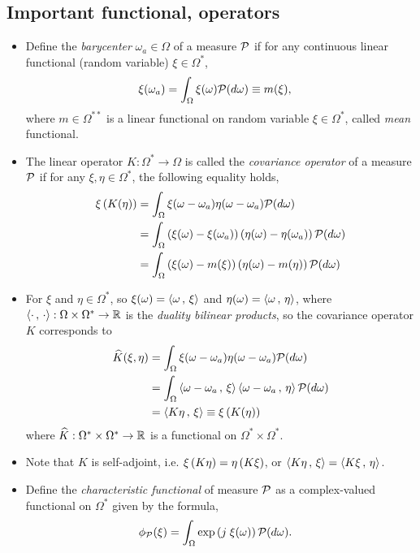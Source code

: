 \documentclass[11pt]{article}
\begin{document}
\subsection{Important functional, operators}
\begin{itemize}
\item Define the \emph{barycenter} $\omega_{a}\in \Omega$ of a measure ${\mathcal P}$ if for any continuous linear functional (random variable) $\xi\in \Omega^{*}$, 
\begin{align}
\xi(\omega_{a}) &= \int_{\Omega}\xi(\omega){\mathcal P}(d\omega) \equiv m(\xi)  , \label{expr: mean_operator}
\end{align}
where $m\in \Omega^{**}$ is a linear functional on random variable $\xi \in \Omega^{*}$, called \emph{mean} functional.

\item The linear operator  $K: \Omega^{*} \rightarrow \Omega$ is called the \emph{covariance operator} of a measure ${\mathcal P}$ if  for any $\xi, \eta \in \Omega^{*}$,  the following equality holds,
\begin{align}
\xi\left( K(\eta ) \right) &= \int_{\Omega}\xi(\omega - \omega_{a})\eta(\omega - \omega_{a}){\mathcal P}(d\omega) \nonumber\\
&= \int_{\Omega}\left(\xi(\omega) - \xi(\omega_{a})\right)\left(\eta(\omega) - \eta(\omega_{a})\right){\mathcal P}(d\omega)\nonumber\\
&= \int_{\Omega}\left(\xi(\omega) - m(\xi)\right)\left(\eta(\omega) - m(\eta)\right){\mathcal P}(d\omega) \label{expr: covariance_operator}
\end{align}

\item For $\xi$ and $\eta\in \Omega^{*}$, so $\xi(\omega) = \left\langle \omega\,,\, \xi \right\rangle$ and $\eta(\omega) = \left\langle \omega\,,\, \eta \right\rangle$, where $\left\langle \cdot\,,\, \cdot \right\rangle: \Omega\times \Omega^{*}  \rightarrow {\mathbb R}$ is the \emph{duality bilinear products}, so the covariance operator $K$ corresponds to 
\begin{align}
 \widehat{K}(\xi, \eta) &= \int_{\Omega}\xi(\omega - \omega_{a})\eta(\omega - \omega_{a}){\mathcal P}(d\omega) \nonumber\\
&= \int_{\Omega}\left\langle \omega - \omega_{a}\,,\, \xi \right\rangle \left\langle \omega - \omega_{a}\,,\, \eta \right\rangle{\mathcal P}(d\omega) \nonumber\\
&= \left\langle K\eta\,,\, \xi \right\rangle\equiv  \xi\left( K(\eta ) \right)
\end{align}
where $\widehat{K}: \Omega^{*} \times \Omega^{*} \rightarrow {\mathbb R}$ is a functional on $\Omega^{*}\times \Omega^{*}$.

\item Note that $K$ is self-adjoint, i.e. $\xi\left( K\eta \right) = \eta\left(K \xi\right) $, or $\left\langle K\eta\,,\, \xi \right\rangle = \left\langle K\xi\,,\, \eta \right\rangle$.

\item Define the \emph{characteristic functional} of measure ${\mathcal P}$ as a complex-valued functional on $\Omega^{*}$ given by the formula, 
\begin{align}
\phi_{{\mathcal P}}(\xi) &= \int_{\Omega} \exp\left(j\; \xi(\omega)\right){\mathcal P}(d\omega). \label{expr: char_functional}
\end{align}
\end{itemize}
\end{document}
